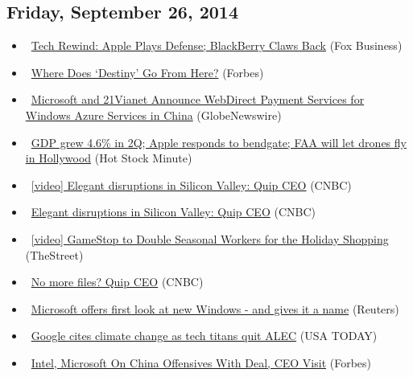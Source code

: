 \documentclass[11pt,asymmetric]{article}
\begin{document}
\subsection*{Friday, September 26, 2014}
\begin{itemize}
\item\ \href{http://www.foxbusiness.com/technology/2014/09/26/tech-rewind-apple-plays-defense-blackberry-claws-back/}{Tech Rewind: Apple Plays Defense; BlackBerry Claws Back} (Fox Business)
\item\ \href{http://www.forbes.com/sites/insertcoin/2014/09/26/where-does-destiny-go-from-here/?partner=yahootix}{Where Does `Destiny' Go From Here?} (Forbes)
\item\ \href{http://finance.yahoo.com/news/microsoft-21vianet-announce-webdirect-payment-120000570.html}{Microsoft and 21Vianet Announce WebDirect Payment Services for Windows Azure Services in China} (GlobeNewswire)
\item\ \href{http://finance.yahoo.com/blogs/hot-stock-minute/final-gdp-revision--apple-responds-to-bendgate--faa-will-let-drones-fly-in-hollywood-115746363.html}{GDP grew 4.6\% in 2Q; Apple responds to bendgate; FAA will let drones fly in Hollywood} (Hot Stock Minute)
\item\ \href{http://video.cnbc.com/gallery/?video=3000314337&__source=yahoo%7cheadline%7cquote%7cvideo%7c&par=yahoo}{[video] Elegant disruptions in Silicon Valley: Quip CEO} (CNBC)
\item\ \href{http://finance.yahoo.com/video/elegant-disruptions-silicon-valley-quip-114400105.html}{Elegant disruptions in Silicon Valley: Quip CEO} (CNBC)
\item\ \href{http://www.thestreet.com/_yahoo/story/12893406/1/gamestop-to-double-seasonal-workers-for-the-holiday-shopping.html?cm_ven=YAHOOV&cm_cat=FREE&cm_ite=NA}{[video] GameStop to Double Seasonal Workers for the Holiday Shopping} (TheStreet)
\item\ \href{http://finance.yahoo.com/video/no-more-files-quip-ceo-114200719.html}{No more files? Quip CEO} (CNBC)
\item\ \href{http://finance.yahoo.com/news/microsoft-offers-first-look-windows-110707224.html}{Microsoft offers first look at new Windows - and gives it a name} (Reuters)
\item\ \href{http://www.usatoday.com/story/money/business/2014/09/26/tech-titans-bolt-conservative-alec-over-climate-flap/16233881/}{Google cites climate change as tech titans quit ALEC} (USA TODAY)
\item\ \href{http://www.forbes.com/sites/dougyoung/2014/09/26/intel-microsoft-on-china-offensives-with-deal-ceo-visit/?partner=yahootix}{Intel, Microsoft On China Offensives With Deal, CEO Visit} (Forbes)
\end{itemize}
\end{document}
